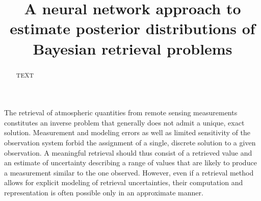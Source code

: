 \documentclass[journal abbreviation, manuscript]{copernicus}
\begin{document}
\title{A neural network approach to estimate posterior distributions of Bayesian retrieval problems}












\received{}
\pubdiscuss{} %
\revised{}
\accepted{}
\published{}




\maketitle



\begin{abstract}
TEXT
\end{abstract}




\introduction  %

The retrieval of atmospheric quantities from remote sensing measurements
constitutes an inverse problem that generally does not admit a unique, exact
solution. Measurement and modeling errors as well as limited sensitivity of the
observation system forbid the assignment of a single, discrete solution to a
given observation. A meaningful retrieval should thus consist of a retrieved
value and an estimate of uncertainty describing a range of values that are
likely to produce a measurement similar to the one observed. However, even
if a retrieval method allows for explicit modeling of retrieval uncertainties,
their computation and representation is often possible only in an approximate
manner.
\end{document}
